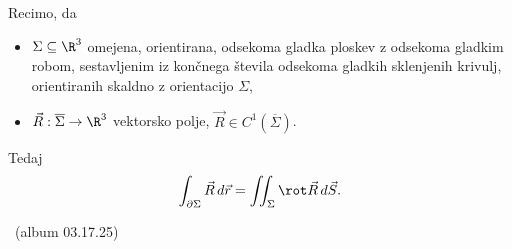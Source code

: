 \begin{izrek}[Stokes]
    Recimo, da
    \begin{itemize}
        \item \(\Sigma \subseteq \R^3\) omejena, orientirana, odsekoma gladka ploskev z odsekoma gladkim robom, sestavljenim iz končnega števila odsekoma gladkih sklenjenih krivulj, orientiranih skaldno z orientacijo \(\Sigma\),
        \item \(\vec{R}: \overline{\Sigma} \to \R^3\) vektorsko polje, \(\vec{R} \in C^1(\overline{\Sigma})\).
    \end{itemize}    
    Tedaj
    \[\int_{\partial \Sigma} \vec{R} \, d \vec{r} = \iint_\Sigma \rot \vec{R} \, d \vec{S}.\]
\end{izrek}

\begin{zgled}
    \todo \ (album 03.17.25)
\end{zgled}
